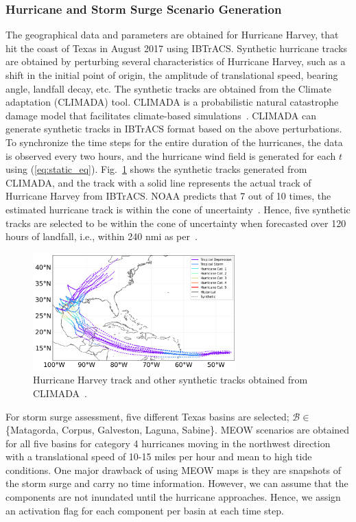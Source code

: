\subsubsection{Hurricane and Storm Surge Scenario Generation}
The geographical data and parameters are obtained for Hurricane Harvey, that hit the coast of Texas in August 2017 using IBTrACS. Synthetic hurricane tracks are obtained by perturbing several characteristics of Hurricane Harvey, such as a shift in the initial point of origin, the amplitude of translational speed, bearing angle, landfall decay, etc. The synthetic tracks are obtained from the Climate adaptation (CLIMADA) tool. CLIMADA is a probabilistic natural catastrophe damage model that facilitates climate-based simulations~\cite{Climada}. CLIMADA can generate synthetic tracks in IBTrACS format based on the above perturbations. To synchronize the time steps for the entire duration of the hurricanes, the data is observed every two hours, and the hurricane wind field is generated for each $t$ using (\ref{eq:static_eq}). Fig.~\ref{fig:static_harvey} shows the synthetic tracks generated from CLIMADA, and the track with a solid line represents the actual track of Hurricane Harvey from IBTrACS. NOAA predicts that 7 out of 10 times, the estimated hurricane track is within the cone of uncertainty~\cite{NOAA_uncertainty}. Hence, five synthetic tracks are selected to be within the cone of uncertainty when forecasted over 120 hours of landfall, i.e., within 240 nmi as per~\cite{NOAA_uncertainty}.   

\begin{figure}[t]
    \centering
        \includegraphics[width=0.7\textwidth]{figures/synthetic_tracks.png}
        \caption{Hurricane Harvey track and other synthetic tracks obtained from CLIMADA~\cite{Climada}.}
        \label{fig:static_harvey}
\end{figure}

For storm surge assessment, five different Texas basins are selected; $\mathcal{B} \in$ \{Matagorda, Corpus, Galveston, Laguna, Sabine\}. MEOW scenarios are obtained for all five basins for category 4 hurricanes moving in the northwest direction with a translational speed of 10-15 miles per hour and mean to high tide conditions. One major drawback of using MEOW maps is they are snapshots of the storm surge and carry no time information. However, we can assume that the components are not inundated until the hurricane approaches. Hence, we assign an activation flag for each component per basin at each time step. 


